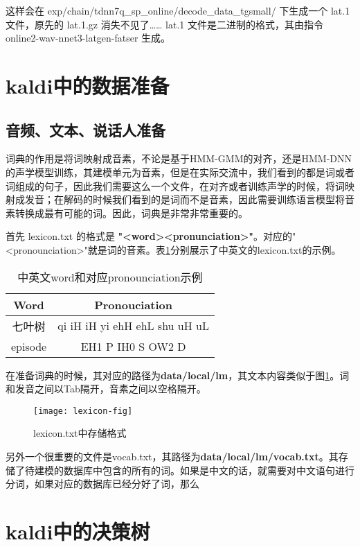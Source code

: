这样会在 exp/chain/tdnn7q\_sp\_online/decode\_data\_tgsmall/ 下生成一个 lat.1 文件，原先的 lat.1.gz 消失不见了…… lat.1 文件是二进制的格式，其由指令 online2-wav-nnet3-latgen-fatser 生成。

\section{kaldi中的数据准备}
\subsection{音频、文本、说话人准备}

词典的作用是将词映射成音素，不论是基于HMM-GMM的对齐，还是HMM-DNN的声学模型训练，其建模单元为音素，但是在实际交流中，我们看到的都是词或者词组成的句子，因此我们需要这么一个文件，在对齐或者训练声学的时候，将词映射成发音；在解码的时候我们看到的是词而不是音素，因此需要训练语言模型将音素转换成最有可能的词。因此，词典是非常非常重要的。

首先 lexicon.txt 的格式是 {\bf "<word>\qquad<pronunciation>"}。对应的"<pronounciation>"就是词的音素。表\ref{tab:lexicon-format}分别展示了中英文的lexicon.txt的示例。
\begin{table}[h]
\centering
\caption{中英文word和对应pronounciation示例}
   \begin{tabular*}{1\textwidth}{@{\extracolsep{\fill}}cc}
   \toprule
    {\bf Word} & {\bf Pronouciation} \\
   \midrule
   七叶树   & qi iH iH yi ehH ehL shu uH uL \\
   episode & EH1 P IH0 S OW2 D  \\
   \bottomrule
   \end{tabular*}
 \label{tab:lexicon-format}
\end{table}

在准备词典的时候，其对应的路径为{\bf data/local/lm}，其文本内容类似于图\ref{fig:lexicon-fig}。词和发音之间以Tab隔开，音素之间以空格隔开。
\begin{figure}[!ht]
  \centering
  \texttt{[image: lexicon-fig]}
  \caption{lexicon.txt中存储格式}
\label{fig:lexicon-fig}
\end{figure}

另外一个很重要的文件是vocab.txt，其路径为{\bf data/local/lm/vocab.txt}。其存储了待建模的数据库中包含的所有的词。如果是中文的话，就需要对中文语句进行分词，如果对应的数据库已经分好了词，那么


\section{kaldi中的决策树}
\label{sec:kaldi-dt}


